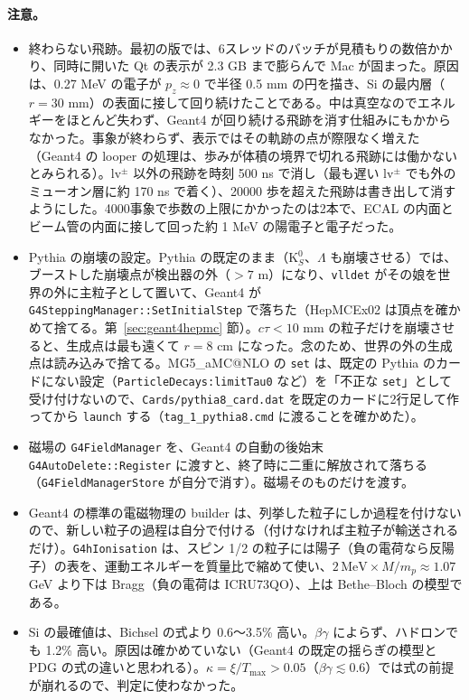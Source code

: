 \documentclass[a4paper,10pt]{ltjsarticle}
\makeatletter
\newcommand{\MGaMC}{MG5\_aMC@NLO}
\makeatother
\begin{document}
\paragraph{注意。}
\begin{itemize}
\item 終わらない飛跡。最初の版では、6スレッドのバッチが見積もりの数倍かかり、同時に開いた Qt の表示が 2.3 GB まで膨らんで Mac が固まった。原因は、0.27 MeV の電子が $p_z\approx0$ で半径 0.5 mm の円を描き、Si の最内層（$r=30$ mm）の表面に接して回り続けたことである。中は真空なのでエネルギーをほとんど失わず、Geant4 が回り続ける飛跡を消す仕組みにもかからなかった。事象が終わらず、表示ではその軌跡の点が際限なく増えた（Geant4 の looper の処理は、歩みが体積の境界で切れる飛跡には働かないとみられる）。lv$^\pm$ 以外の飛跡を時刻 500 ns で消し（最も遅い lv$^\pm$ でも外のミューオン層に約 170 ns で着く）、20000 歩を超えた飛跡は書き出して消すようにした。4000事象で歩数の上限にかかったのは2本で、ECAL の内面とビーム管の内面に接して回った約 1 MeV の陽電子と電子だった。
\item Pythia の崩壊の設定。Pythia の既定のまま（K$^0_S$、$\Lambda$ も崩壊させる）では、ブーストした崩壊点が検出器の外（$>7$ m）になり、\texttt{vlldet} がその娘を世界の外に主粒子として置いて、Geant4 が \texttt{G4SteppingManager::SetInitialStep} で落ちた（HepMCEx02 は頂点を確かめて捨てる。第~\ref{sec:geant4hepmc} 節）。$c\tau<10$ mm の粒子だけを崩壊させると、生成点は最も遠くて $r=8$ cm になった。念のため、世界の外の生成点は読み込みで捨てる。\MGaMC{} の \texttt{set} は、既定の Pythia のカードにない設定（\texttt{ParticleDecays:limitTau0} など）を「不正な \texttt{set}」として受け付けないので、\texttt{Cards/pythia8\_card.dat} を既定のカードに2行足して作ってから \texttt{launch} する（\texttt{tag\_1\_pythia8.cmd} に渡ることを確かめた）。
\item 磁場の \texttt{G4FieldManager} を、Geant4 の自動の後始末 \texttt{G4AutoDelete::\allowbreak Register} に渡すと、終了時に二重に解放されて落ちる（\texttt{G4FieldManager\allowbreak Store} が自分で消す）。磁場そのものだけを渡す。
\item Geant4 の標準の電磁物理の builder は、列挙した粒子にしか過程を付けないので、新しい粒子の過程は自分で付ける（付けなければ主粒子が輸送されるだけ）。\texttt{G4hIonisation} は、スピン 1/2 の粒子には陽子（負の電荷なら反陽子）の表を、運動エネルギーを質量比で縮めて使い、$2\,\mathrm{MeV}\times M/m_p\approx1.07$ GeV より下は Bragg（負の電荷は ICRU73QO）、上は Bethe--Bloch の模型である。
\item Si の最確値は、Bichsel の式より 0.6〜3.5\% 高い。$\beta\gamma$ によらず、ハドロンでも 1.2\% 高い。原因は確かめていない（Geant4 の既定の揺らぎの模型と PDG の式の違いと思われる）。$\kappa=\xi/T_{\max}>0.05$（$\beta\gamma\lesssim0.6$）では式の前提が崩れるので、判定に使わなかった。

\end{itemize}
\end{document}
